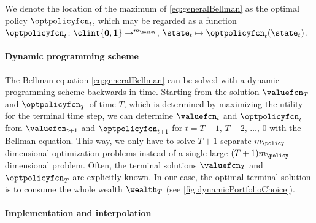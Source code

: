 We denote the location of the maximum of \eqref{eq:generalBellman}
as the optimal policy $\optpolicyfcn_t$,
which may be regarded as a function
$\optpolicyfcn_t\colon \clint{\*0, \*1} \to \real^{m_{\policy}}$,
$\state_t \mapsto \optpolicyfcn_t(\state_t)$.

\paragraph{Dynamic programming scheme}

The Bellman equation \eqref{eq:generalBellman} can be solved
with a dynamic programming scheme backwards in time.
Starting from the solution $\valuefcn_T$ and $\optpolicyfcn_T$
of time $T$, which is determined by maximizing the utility
for the terminal time step,
we can determine $\valuefcn_t$ and $\optpolicyfcn_t$
from $\valuefcn_{t+1}$ and $\optpolicyfcn_{t+1}$
for $t = T - 1,\, T - 2,\, \dotsc,\, 0$ with the Bellman equation.
This way, we only have to solve $T+1$ separate $m_{\policy}$-dimensional
optimization problems instead of a single large
$(T+1) m_{\policy}$-dimensional problem.
Often, the terminal solutions $\valuefcn_T$ and $\optpolicyfcn_T$
are explicitly known.
In our case, the optimal terminal solution is
to consume the whole wealth $\wealth_T$
(see \cref{fig:dynamicPortfolioChoice}).

\paragraph{Implementation and interpolation}

